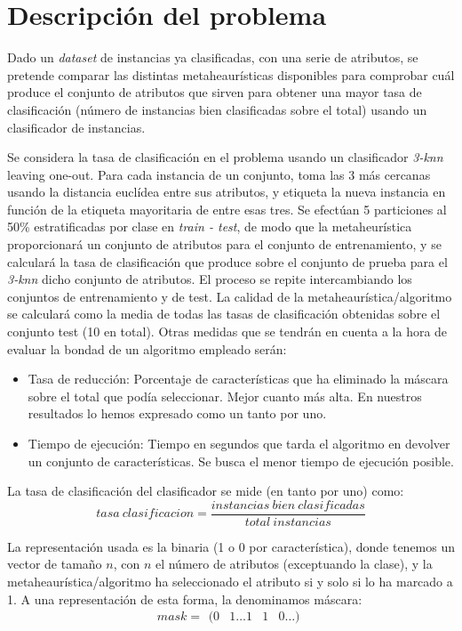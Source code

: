 \documentclass[a4paper,11pt]{article}
\newcommand{\imagent}[4]{
  \begin{wrapfigure}{#4}{0.7\textwidth}
    \begin{center}
    \texttt{[image: \#1]}
    \end{center}
    \caption{#3}
    \label{#4}
  \end{wrapfigure}
}
\newcommand{\imagen}[4]{
  \begin{minipage}{\linewidth}
    \centering
    \texttt{[image: \#1]}
    \captionof{figure}{#2}
    \label{#3}
  \end{minipage} 
}
\begin{document}
\newpage
\tableofcontents
\newpage

\section{Descripción del problema}
Dado un \textit{dataset} de instancias ya clasificadas, con una serie de atributos, se pretende comparar las distintas 
metaheaurísticas disponibles para comprobar cuál produce el conjunto de atributos que sirven para obtener una mayor 
tasa de clasificación (número de instancias bien clasificadas sobre el total) usando un clasificador de instancias.

Se considera la tasa de clasificación en el problema usando un clasificador \textit{3-knn} leaving one-out. Para cada 
instancia de un conjunto, toma las 3 más cercanas usando la distancia euclídea entre sus atributos, y etiqueta la nueva
instancia en función de la etiqueta mayoritaria de entre esas tres. Se efectúan 5 particiones al 50\% estratificadas
por clase en \textit{train - test}, de modo que la metaheurística proporcionará un conjunto de atributos para el conjunto de
entrenamiento, y se calculará la tasa de clasificación que produce sobre el conjunto de prueba para el \textit{3-knn} dicho
conjunto de atributos. El proceso se repite intercambiando los conjuntos de entrenamiento y de test. La calidad de la 
metaheaurística/algoritmo se calculará como la media de todas las tasas de clasificación obtenidas sobre el conjunto test
(10 en total). Otras medidas que se tendrán en cuenta a la hora de evaluar la bondad de un algoritmo empleado serán:
\begin{itemize}
 \item Tasa de reducción: Porcentaje de características que ha eliminado la máscara sobre el total que podía 
 seleccionar. Mejor cuanto más alta. En nuestros resultados lo hemos expresado como un tanto por uno.
 \item Tiempo de ejecución: Tiempo en segundos que tarda el algoritmo en devolver un conjunto de características.
 Se busca el menor tiempo de ejecución posible.
\end{itemize}


La tasa de clasificación del clasificador se mide (en tanto por uno) como: $$tasa\: clasificacion = \frac{instancias\: 
bien\: clasificadas}{total\: instancias}$$

La representación usada es la binaria (1 o 0 por característica), donde tenemos un vector de tamaño $n$, con $n$ el número 
de atributos (exceptuando la clase), y la metaheaurística/algoritmo ha seleccionado el atributo si y solo si lo ha marcado 
a 1. A una representación de esta forma, la denominamos máscara: $$ mask =\begin{matrix} (0 & 1\ldots 1 & 1 & 0\ldots) 
\end{matrix}$$
\end{document}
